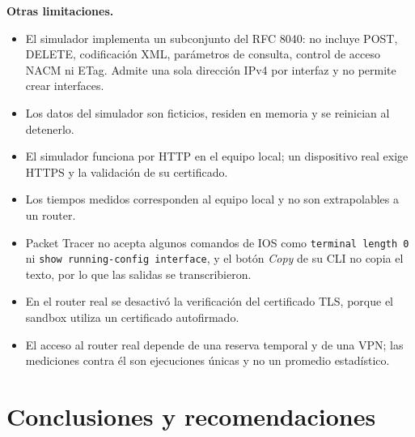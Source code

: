 \textbf{Otras limitaciones.}
\begin{itemize}
  \item El simulador implementa un subconjunto del RFC 8040: no incluye POST, DELETE, codificación XML, parámetros de consulta, control de acceso NACM ni ETag. Admite una sola dirección IPv4 por interfaz y no permite crear interfaces.
  \item Los datos del simulador son ficticios, residen en memoria y se reinician al detenerlo.
  \item El simulador funciona por HTTP en el equipo local; un dispositivo real exige HTTPS y la validación de su certificado.
  \item Los tiempos medidos corresponden al equipo local y no son extrapolables a un router.
  \item Packet Tracer no acepta algunos comandos de IOS como \texttt{terminal length 0} ni \texttt{show running-config interface}, y el botón \textit{Copy} de su CLI no copia el texto, por lo que las salidas se transcribieron.
  \item En el router real se desactivó la verificación del certificado TLS, porque el sandbox utiliza un certificado autofirmado.
  \item El acceso al router real depende de una reserva temporal y de una VPN; las mediciones contra él son ejecuciones únicas y no un promedio estadístico.
\end{itemize}

\section{Conclusiones y recomendaciones}

